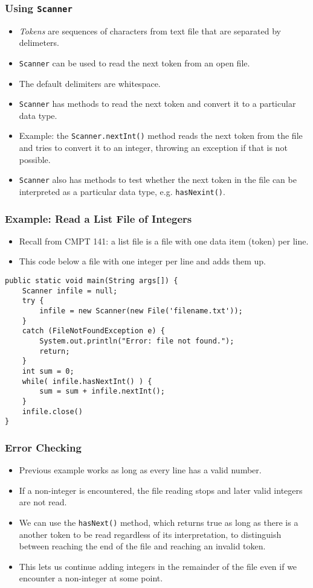 \documentclass[cmptslides]{cmpt280-slidesandsolutions}
\begin{document}
\begin{frame}
	\frametitle{Using \lstinline{Scanner}}
	\begin{itemize}
		\item \textit{Tokens} are sequences of characters from text file that are separated by delimeters.
		\item \lstinline{Scanner} can be used to read the next token from an open file.
		\item The default delimiters are whitespace.
		\item \lstinline{Scanner} has methods to read the next token and convert it to a particular data type.
		\item Example: the \lstinline{Scanner.nextInt()} method reads the next token from the file and tries to convert it to an integer, throwing an exception if that is not possible.
		\item \lstinline{Scanner} also has methods to test whether the next token in the file can be interpreted as a particular data type, e.g. \lstinline{hasNexint()}.
	\end{itemize}
\end{frame}


\begin{frame}[fragile]
\frametitle{Example:  Read a List File of Integers}
\begin{itemize}
	\item Recall from CMPT 141: a list file is a file with one data item (token) per line.
	\item This code below a file with one integer per line and adds them up.
\end{itemize}	
\begin{lstlisting}[basicstyle=\tt\tiny,tabsize=4]
public static void main(String args[]) {
	Scanner infile = null;
	try {
		infile = new Scanner(new File('filename.txt'));
	}
	catch (FileNotFoundException e) {
		System.out.println("Error: file not found.");
		return;
	}
	int sum = 0;
	while( infile.hasNextInt() ) {
		sum = sum + infile.nextInt();
	}
	infile.close()
}	
\end{lstlisting}
\end{frame}


\begin{frame}
\frametitle{Error Checking}
\begin{itemize}
	\item Previous example works as long as every line has a valid number.
	\item If a non-integer is encountered, the file reading stops and later valid integers are not read.
	\item We can use the \lstinline{hasNext()} method, which returns true as long as there is a another token to be read regardless of its interpretation, to distinguish between reaching the end of the file and reaching an invalid token.
	\item This lets us continue adding integers in the remainder of the file even if we encounter a non-integer at some point.
\end{itemize}	
\end{frame}
\end{document}
